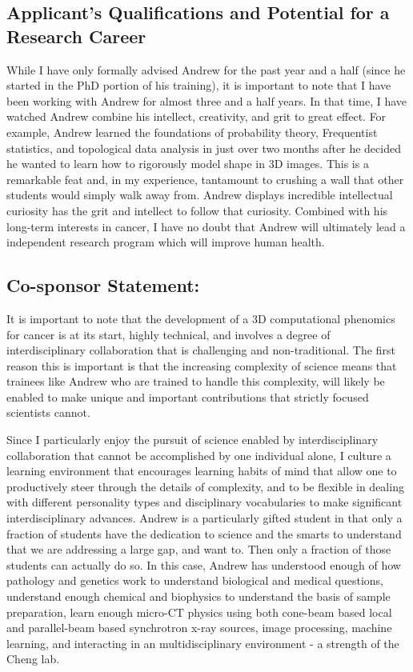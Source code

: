 \documentclass{NIHGrant}
\begin{document}
\subsection*{Applicant's Qualifications and Potential for a Research Career}

While I have only formally advised Andrew for the past year and a half (since he started in the PhD portion of his training), it is important to note that I have been working with Andrew for almost three and a half years. 
In that time, I have watched Andrew combine his intellect, creativity, and grit to great effect. For example, Andrew learned the foundations of probability theory, Frequentist statistics, and topological data analysis in just over two months after he decided he wanted to learn how to rigorously model shape in 3D images. This is a remarkable feat and, in my experience, tantamount to crushing a wall that other students would simply walk away from. Andrew displays incredible intellectual curiosity has the grit and intellect to follow that curiosity. Combined with his long-term interests in cancer, I have no doubt that Andrew will ultimately lead a independent research program which will improve human health. 

\subsection*{Co-sponsor Statement: }
It is important to note that the development of a 3D computational phenomics for cancer is at its start, highly technical, and involves a degree of interdisciplinary collaboration that is challenging and non-traditional. The first reason this is important is that the increasing complexity of science means that trainees like Andrew who are trained to handle this complexity, will likely be enabled to make unique and important contributions that strictly focused scientists cannot. 

Since I particularly enjoy the pursuit of science enabled by interdisciplinary collaboration that cannot be accomplished by one individual alone, I culture a learning environment that encourages learning habits of mind that allow one to productively steer through the details of complexity, and to be flexible in dealing with different personality types and disciplinary vocabularies to make significant interdisciplinary advances. Andrew is a particularly gifted student in that only a fraction of students have the dedication to science and the smarts to understand that we are addressing a large gap, and want to. Then only a fraction of those students can actually do so. In this case, Andrew has understood enough of how pathology and genetics work to understand biological and medical questions, understand enough chemical and biophysics to understand the basis of sample preparation, learn enough micro-CT physics using both cone-beam based local and parallel-beam based synchrotron x-ray sources, image processing, machine learning, and interacting in an multidisciplinary environment - a strength of the Cheng lab. 
\end{document}
